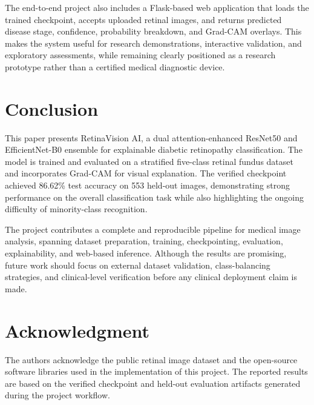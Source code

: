 \documentclass[conference]{IEEEtran}
\begin{document}
The end-to-end project also includes a Flask-based web application that loads the trained checkpoint, accepts uploaded retinal images, and returns predicted disease stage, confidence, probability breakdown, and Grad-CAM overlays. This makes the system useful for research demonstrations, interactive validation, and exploratory assessments, while remaining clearly positioned as a research prototype rather than a certified medical diagnostic device.

\section{Conclusion}
This paper presents RetinaVision AI, a dual attention-enhanced ResNet50 and EfficientNet-B0 ensemble for explainable diabetic retinopathy classification. The model is trained and evaluated on a stratified five-class retinal fundus dataset and incorporates Grad-CAM for visual explanation. The verified checkpoint achieved 86.62\% test accuracy on 553 held-out images, demonstrating strong performance on the overall classification task while also highlighting the ongoing difficulty of minority-class recognition.

The project contributes a complete and reproducible pipeline for medical image analysis, spanning dataset preparation, training, checkpointing, evaluation, explainability, and web-based inference. Although the results are promising, future work should focus on external dataset validation, class-balancing strategies, and clinical-level verification before any clinical deployment claim is made.

\section*{Acknowledgment}
The authors acknowledge the public retinal image dataset and the open-source software libraries used in the implementation of this project. The reported results are based on the verified checkpoint and held-out evaluation artifacts generated during the project workflow.
\end{document}
